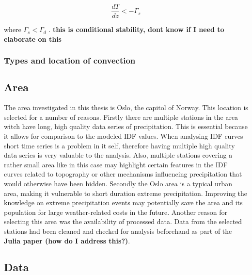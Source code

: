 \begin{equation}
    \frac{dT}{dz} < -\Gamma_s
\end{equation}

where $\Gamma_s < \Gamma_d$ \cite{marshall}. 
\textbf{this is conditional stability, dont know if I need to elaborate on this}


\subsubsection{Types and location of convection}



\subsection{Area}

The area investigated in this thesis is Oslo, the capitol of Norway. This location is selected for a number of reasons. Firstly there are multiple stations in the area witch have long, high quality data series of precipitation. This is essential because it allows for comparison to the modeled IDF values. When analysing IDF curves short time series is a problem in it self, therefore having multiple high quality data series is very valuable to the analysis. Also, multiple stations covering a rather small area like in this case may highlight certain features in the IDF curves related to topography or other mechanisms influencing precipitation that would otherwise have been hidden. Secondly the Oslo area is a typical urban area, making it vulnerable to short duration extreme precipitation. Improving the knowledge on extreme precipitation events may potentially save the area and its population for large weather-related costs in the future. Another reason for selecting this area was the availability of processed data. Data from the selected stations had been cleaned and checked for analysis beforehand as part of the \textbf{Julia paper (how do I address this?)}. 

\subsection{Data}

